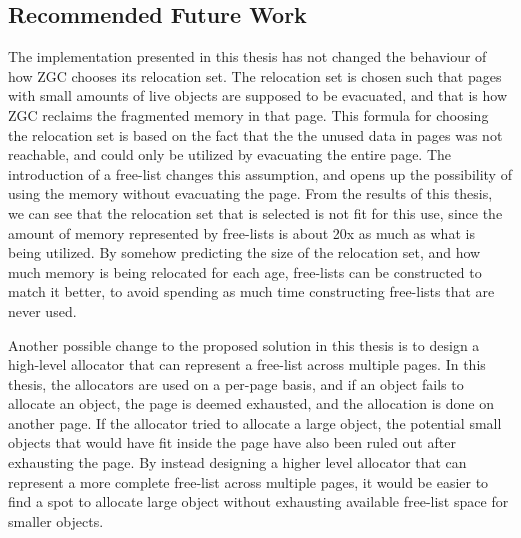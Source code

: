 \subsection{Recommended Future Work}
The implementation presented in this thesis has not changed the behaviour of how ZGC chooses its relocation set. The relocation set is chosen such that pages with small amounts of live objects are supposed to be evacuated, and that is how ZGC reclaims the fragmented memory in that page. This formula for choosing the relocation set is based on the fact that the the unused data in pages was not reachable, and could only be utilized by evacuating the entire page. The introduction of a free-list changes this assumption, and opens up the possibility of using the memory without evacuating the page. From the results of this thesis, we can see that the relocation set that is selected is not fit for this use, since the amount of memory represented by free-lists is about 20x as much as what is being utilized. By somehow predicting the size of the relocation set, and how much memory is being relocated for each age, free-lists can be constructed to match it better, to avoid spending as much time constructing free-lists that are never used.

Another possible change to the proposed solution in this thesis is to design a high-level allocator that can represent a free-list across multiple pages. In this thesis, the allocators are used on a per-page basis, and if an object fails to allocate an object, the page is deemed exhausted, and the allocation is done on another page. If the allocator tried to allocate a large object, the potential small objects that would have fit inside the page have also been ruled out after exhausting the page. By instead designing a higher level allocator that can represent a more complete free-list across multiple pages, it would be easier to find a spot to allocate large object without exhausting available free-list space for smaller objects. 

